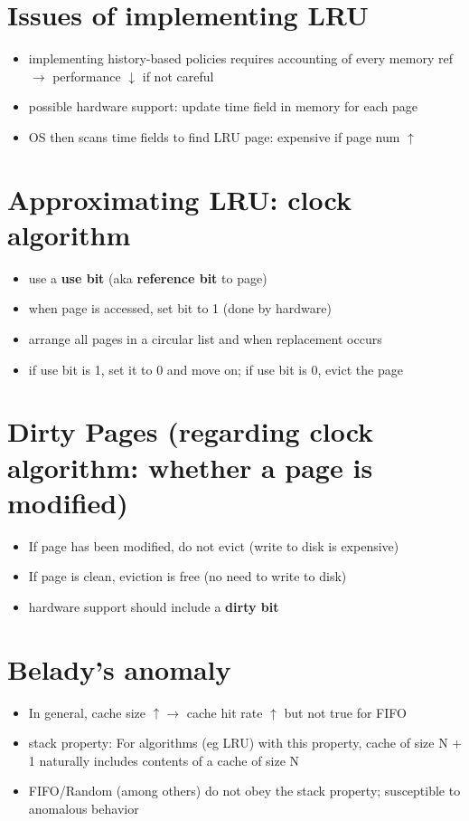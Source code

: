\section*{Issues of implementing LRU}
\begin{itemize}
\item implementing history-based policies requires accounting of every memory ref $\to$ performance $\downarrow$ if not careful
\item possible hardware support: update time field in memory for each page
\item OS then scans time fields to find LRU page: expensive if page num $\uparrow$
\end{itemize}
\section*{Approximating LRU: clock algorithm}
\begin{itemize}
\item use a \textbf{use bit} (aka \textbf{reference bit} to page)
\item when page is accessed, set bit to 1 (done by hardware)
\item arrange all pages in a circular list and when replacement occurs
\item if use bit is 1, set it to 0 and move on; if use bit is 0, evict the page
\end{itemize}
\section*{Dirty Pages (regarding clock algorithm: whether a page is modified)}
\begin{itemize}
\item If page has been modified, do not evict (write to disk is expensive)
\item If page is clean, eviction is free (no need to write to disk)
\item hardware support should include a \textbf{dirty bit}
\end{itemize}
\section*{Belady's anomaly}
\begin{itemize}
\item In general, cache size $\uparrow \to$ cache hit rate $\uparrow$ but not true for FIFO
\item stack property: For algorithms (eg LRU) with this property, cache of size N + 1 naturally includes contents of a cache of size N
\item FIFO/Random (among others) do not obey the stack property; susceptible to anomalous behavior
\end{itemize}
